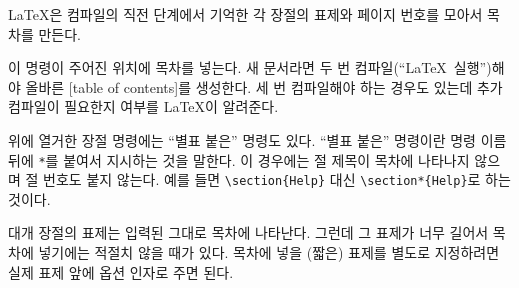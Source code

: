 \LaTeX 은 컴파일의 직전 단계에서 기억한 각 장절의 표제와 페이지 번호를 모아서 목차를 만든다.
\begin{lscommand}
\end{lscommand}
\noindent 이 명령이 주어진 위치에 목차를 넣는다.
새 문서라면 두 번 컴파일(``\LaTeX\ 실행'')해야 올바른 [table of contents]를 생성한다.
세 번 컴파일해야 하는 경우도 있는데 추가 컴파일이 필요한지 여부를 \LaTeX 이 알려준다.

위에 열거한 장절 명령에는 ``별표 붙은'' 명령도 있다. ``별표 붙은'' 명령이란 명령 이름 뒤에 
\verb|*|를 붙여서 지시하는 것을 말한다. 이 경우에는 절 제목이 목차에 나타나지 않으며 절 번호도 붙지 않는다.
예를 들면 \verb|\section{Help}| 대신 \verb|\section*{Help}|로 하는 것이다.

대개 장절의 표제는 입력된 그대로 목차에 나타난다. 그런데 그 표제가 너무 길어서 
목차에 넣기에는 적절치 않을 때가 있다. 목차에 넣을 (짧은) 표제를 별도로 지정하려면 
실제 표제 앞에 옵션 인자로 주면 된다.


